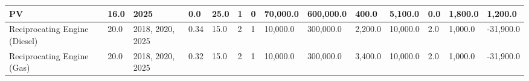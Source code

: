 \documentclass[sigconf]{acmart}
\begin{document}
\begin{table*}[]
\begin{tabularx}{\linewidth}{|p{}|l|x|l|l|l|l|l|l|l|l|l|l|l|}
PV                            & 16.0        & 2025             & 0.0    & 25.0 & 1     & 0     & 70,000.0  & 600,000.0   & 400.0     & 5,100.0  & 0.0   & 1,800.0  & 1,200.0   \\ \hline
Reciprocating Engine (Diesel) & 20.0        & 2018, 2020, 2025 & 0.34   & 15.0 & 2     & 1     & 10,000.0  & 300,000.0   & 2,200.0   & 10,000.0 & 2.0   & 1,000.0  & -31,900.0 \\ \hline
Reciprocating Engine (Gas)    & 20.0        & 2018, 2020, 2025 & 0.32   & 15.0 & 2     & 1     & 10,000.0  & 300,000.0   & 3,400.0   & 10,000.0 & 2.0   & 1,000.0  & -31,900.0 \\ \hline
	\end{tabularx}
\end{table*}

\end{document}
